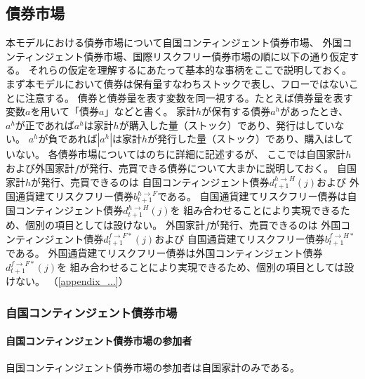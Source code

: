 
\subsection{債券市場}
\label{sec:chapter3_assumptions_bond_markets}
本モデルにおける債券市場について自国コンティンジェント債券市場、
外国コンティンジェント債券市場、国際リスクフリー債券市場の順に以下の通り仮定する。
それらの仮定を理解するにあたって基本的な事柄をここで説明しておく。
まず本モデルにおいて債券は保有量すなわちストックで表し、フローではないことに注意する。
債券と債券量を表す変数を同一視する。たとえば債券量を表す変数\(a\)を用いて「債券\(a\)」などと書く。
家計\(h\)が保有する債券\(a^h\)があったとき、
\(a^h\)が正であれば\(a^h\)は家計\(h\)が購入した量（ストック）であり、発行はしていない。
\(a^h\)が負であれば\(|a^h|\)は家計\(h\)が発行した量（ストック）であり、購入はしていない。
各債券市場についてはのちに詳細に記述するが、
ここでは自国家計\(h\)および外国家計\(f\)が発行、売買できる債券について大まかに説明しておく。
自国家計\(h\)が発行、売買できるのは
自国コンティンジェント債券\(d_{t+1}^{h\to H}(j)\)および
外国通貨建てリスクフリー債券\(b_{t+1}^{h\to F}\)である。
自国通貨建てリスクフリー債券は自国コンティンジェント債券\(d_{t+1}^{h\to H}(j)\)を
組み合わせることにより実現できるため、個別の項目としては設けない。
外国家計\(f\)が発行、売買できるのは
外国コンティンジェント債券\(d_{t+1}^{f\to F*}(j)\)および
自国通貨建てリスクフリー債券\(b_{t+1}^{f\to H*}\)である。
外国通貨建てリスクフリー債券は外国コンティンジェント債券\(d_{t+1}^{f\to F*}(j)\)を
組み合わせることにより実現できるため、個別の項目としては設けない。
（\ref{appendix_...}）

\subsubsection{自国コンティンジェント債券市場}
\label{sec:chapter3_assumptions_bond_markets_home}

\paragraph{自国コンティンジェント債券市場の参加者}
\label{sec:chapter3_assumptions_bond_markets_home_participants}
自国コンティンジェント債券市場の参加者は自国家計のみである。

